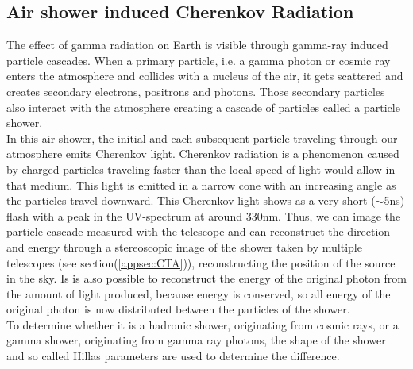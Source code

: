 \documentclass[12pt,article,type=msc,colorback,accentcolor=tud9c]{tudthesis}
\begin{document}
\subsection{Air shower induced Cherenkov Radiation}

\begin{wrapfigure}{R}{0.4\textwidth}
\centering
\texttt{[image: D:/OwnCloudData/00\_WriteUP/04\_Thesis/Pic/Proposal/Fig/\{gamma]}.jpg}
\caption[Cherenkov light cone]{\label{fig:Cherenkov} The cone of Cherenkov light emitted by an extensive air shower. Picture from \cite{AsperaCTA}}
\end{wrapfigure}

The effect of gamma radiation on Earth is visible through gamma-ray induced particle cascades. When a primary particle, i.e. a gamma photon or cosmic ray enters the atmosphere and collides with a nucleus of the air, it gets scattered and creates secondary electrons, positrons and photons. Those secondary particles also interact with the atmosphere creating a cascade of particles called a particle shower.\\
In this air shower, the initial and each subsequent particle traveling through our atmosphere emits Cherenkov light. Cherenkov radiation is a phenomenon caused by charged particles traveling faster than the local speed of light would allow in that medium. This light is emitted in a narrow cone with an increasing angle as the particles travel downward. This Cherenkov light shows as a very short ($\sim$5ns) flash with a peak in the UV-spectrum at around 330nm.
Thus, we can image the particle cascade measured with the telescope and can reconstruct the direction and energy through a stereoscopic image of the shower taken by multiple telescopes (see section(\ref{appsec:CTA})), reconstructing the position of the source in the sky. Is is also possible to reconstruct the energy of the original photon from the amount of light produced, because energy is conserved, so all energy of the original photon is now distributed between the particles of the shower.\\
To determine whether it is a hadronic shower, originating from cosmic rays, or a gamma shower, originating from gamma ray photons, the shape of the shower and so called Hillas parameters are used to determine the difference.
\end{document}
